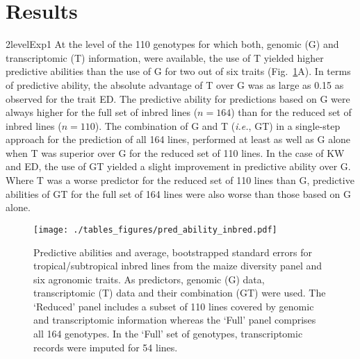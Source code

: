 \documentclass[12pt,titlepage]{article}
\begin{document}
\section*{Results}
\Genetics2level{Exp1}
At the level of the 110 genotypes for which both, genomic (G) and 
transcriptomic (T) information, were available, the use of T yielded higher
predictive abilities than the use of G for two out of six traits
(Fig.~\ref{fig:InbredResults}A).
In terms of predictive ability, the absolute advantage of T over G was as large 
as 0.15 as observed for the trait ED\@.
The predictive ability for predictions based on G were always higher for the
full set of inbred lines ($n = 164$) than for the reduced set of inbred lines
($n = 110$).
The combination of G and T (\textit{i.e.}, GT) in a single-step approach for the 
prediction of all 164 lines, performed at least as well as G alone when T was 
superior over G for the reduced set of 110 lines.
In the case of KW and ED, the use of GT yielded a slight improvement in predictive 
ability over G.
Where T was a worse predictor for the reduced set of 110 lines than G,
predictive abilities of GT for the full set of 164 lines were also worse than 
those based on G alone.

\begin{figure}[H]
  \centering
  \texttt{[image: ./tables\_figures/pred\_ability\_inbred.pdf]}
  \caption{
  Predictive abilities and average, bootstrapped standard errors for
  tropical/subtropical inbred lines from the maize diversity panel and six
  agronomic traits.
  As predictors, genomic (G) data, transcriptomic (T) data and their 
  combination (GT) were used.
  The `Reduced' panel includes a subset of 110 lines covered by genomic and
  transcriptomic information whereas the `Full' panel comprises all 164
  genotypes.
  In the `Full' set of genotypes, transcriptomic records were imputed for 54
  lines.
  }
\label{fig:InbredResults}
\end{figure}
\end{document}
